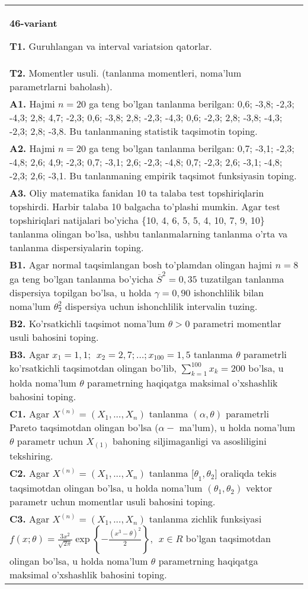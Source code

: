 \documentclass{article}
\begin{document}
\begin{tabular}{m{17cm}}
\textbf{46-variant}
\newline

\textbf{T1.} 
Guruhlangan va interval variatsion qatorlar.
\\
\textbf{T2.} 
Momentler usuli. (tanlanma momentleri, noma'lum parametrlarni baholash).
\\
\textbf{A1.} 
Hajmi \(n = 20\) ga teng bo'lgan tanlanma berilgan: 0,6; -3,8; -2,3; -4,3; 2,8; 4,7; -2,3; 0,6; -3,8; 2,8; -2,3; -4,3; 0,6; -2,3; 2,8; -3,8; -4,3; -2,3; 2,8; -3,8. Bu tanlanmaning statistik taqsimotin toping.
\\
\textbf{A2.} 
Hajmi \(n = 20\) ga teng bo'lgan tanlanma berilgan: 0,7; -3,1; -2,3; -4,8; 2,6; 4,9; -2,3; 0,7; -3,1; 2,6; -2,3; -4,8; 0,7; -2,3; 2,6; -3,1; -4,8; -2,3; 2,6; -3,1. Bu tanlanmaning empirik taqsimot funksiyasin toping.
\\
\textbf{A3.} 
Oliy matematika fanidan 10 ta talaba test topshiriqlarin topshirdi. Harbir talaba 10 balgacha to'plashi mumkin. Agar test topshiriqlari natijalari bo'yicha \{10, 4, 6, 5, 5, 4, 10, 7, 9, 10\} tanlanma olingan bo'lsa, ushbu tanlanmalarning tanlanma o'rta va tanlanma dispersiyalarin toping.
\\
\textbf{B1.} 
Agar normal taqsimlangan bosh to'plamdan olingan hajmi \(n = 8\) ga teng bo'lgan tanlanma bo'yicha \({\overline{S}}^{2} = 0,35\) tuzatilgan tanlanma dispersiya topilgan bo'lsa, u holda \(\gamma = 0,90\) ishonchlilik bilan noma'lum \(\theta_{2}^{2}\) dispersiya uchun ishonchlilik intervalin tuzing.
\\
\textbf{B2.} 
Ko'rsatkichli taqsimot noma'lum \(\theta > 0\) parametri momentlar usuli bahosini toping.
\\
\textbf{B3.} 
Agar \(x_{1} = 1,1;\ \ x_{2} = 2,7;\ldots;x_{100} = 1,5\) tanlanma \(\theta\) parametrli ko'rsatkichli taqsimotdan olingan bo'lib, \(\sum_{k = 1}^{100}x_{k} = 200\) bo'lsa, u holda noma'lum \(\theta\) parametrning haqiqatga maksimal o'xshashlik bahosini toping.
\\
\textbf{C1.} 
Agar \(X^{(n)} = \left( X_{1},...,X_{n} \right)\) tanlanma \((\alpha,\theta)\) parametrli Pareto taqsimotdan olingan bo'lsa (\(\alpha -\) ma'lum), u holda noma'lum \(\theta\) parametr uchun \(X_{(1)}\) bahoning siljimaganligi va asosliligini tekshiring.
\\
\textbf{C2.} 
Agar \(X^{(n)} = \left( X_{1},...,X_{n} \right)\) tanlanma \({\lbrack\theta}_{1},\theta_{2}\rbrack\) oraliqda tekis taqsimotdan olingan bo'lsa, u holda noma'lum \(\left( \theta_{1},\theta_{2} \right)\) vektor parametr uchun momentlar usuli bahosini toping.
\\
\textbf{C3.} 
Agar \(X^{(n)} = \left( X_{1},...,X_{n} \right)\) tanlanma zichlik funksiyasi \(f(x;\theta) = \frac{3x^{2}}{\sqrt{2\pi}}\exp\left\{ - \frac{\left( x^{3} - \theta \right)^{2}}{2} \right\},\ \ x \in R\) bo'lgan taqsimotdan olingan bo'lsa, u holda noma'lum \(\theta\) parametrning haqiqatga maksimal o'xshashlik bahosini toping.
\\

\end{tabular}
\vspace{1cm}
\end{document}
